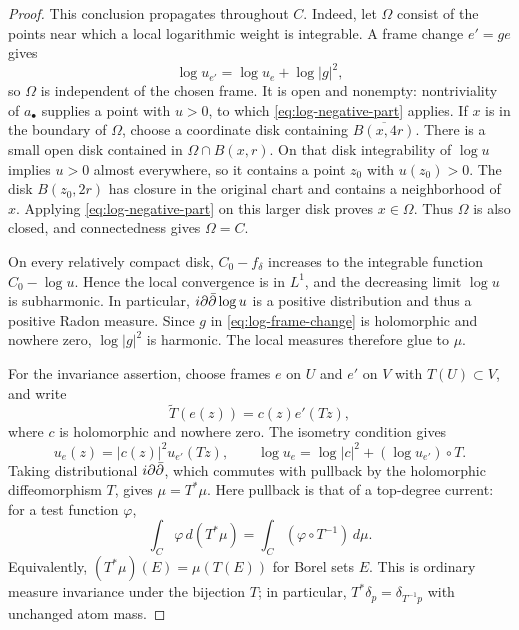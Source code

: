 \begin{proof}
This conclusion propagates throughout $C$.  Indeed, let $\Omega$
consist of the points near which a local logarithmic weight is
integrable.  A frame change $e'=g e$ gives
\begin{equation}
 \label{eq:log-frame-change}
 \log u_{e'}=\log u_e+\log|g|^2,
\end{equation}
so $\Omega$ is independent of the chosen frame.  It is open and
nonempty: nontriviality of $a_\bullet$ supplies a point with $u>0$,
to which \eqref{eq:log-negative-part} applies.  If $x$ is in the
boundary of $\Omega$, choose a coordinate disk containing
$\overline{B(x,4r)}$.  There is a small open disk contained in
$\Omega\cap B(x,r)$.  On that disk integrability of $\log u$ implies
$u>0$ almost everywhere, so it contains a point $z_0$ with $u(z_0)>0$.
The disk $B(z_0,2r)$ has closure in the original chart and contains a
neighborhood of $x$.  Applying \eqref{eq:log-negative-part} on this
larger disk proves $x\in\Omega$.  Thus $\Omega$ is also closed, and
connectedness gives $\Omega=C$.

On every relatively compact disk, $C_0-f_\delta$ increases to the
integrable function $C_0-\log u$.  Hence the local convergence is in
$L^1$, and the decreasing limit $\log u$ is subharmonic.  In particular,
$i\partial\bar\partial\log u$ is a positive distribution and thus a positive Radon
measure.  Since $g$ in \eqref{eq:log-frame-change} is holomorphic and
nowhere zero, $\log|g|^2$ is harmonic.  The local measures therefore
glue to $\mu$.

For the invariance assertion, choose frames $e$ on $U$ and $e'$ on $V$
with $T(U)\subset V$, and write
\[
 \widetilde T(e(z))=c(z)e'(Tz),
\]
where $c$ is holomorphic and nowhere zero.  The isometry condition gives
\[
 u_e(z)=|c(z)|^2u_{e'}(Tz),
 \qquad
 \log u_e=\log|c|^2+(\log u_{e'})\circ T.
\]
Taking distributional $i\partial\bar\partial$, which commutes with pullback by the
holomorphic diffeomorphism $T$, gives $\mu=T^*\mu$.  Here pullback is
that of a top-degree current: for a test function $\varphi$,
\begin{equation}
 \label{eq:measure-pullback}
 \int_C\varphi\,d(T^*\mu)
   =\int_C(\varphi\circ T^{-1})\,d\mu.
\end{equation}
Equivalently, $(T^*\mu)(E)=\mu(T(E))$ for Borel sets $E$.  This is
ordinary measure invariance under the bijection $T$; in particular,
$T^*\delta_p=\delta_{T^{-1}p}$ with unchanged atom mass.


\end{proof}

